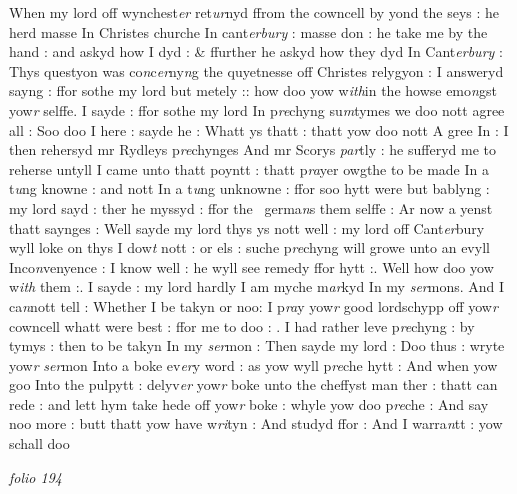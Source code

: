 \documentclass[12pt, a4paper]{book}
\begin{document}
		\ifthenelse{\isodd{\thepage}}
		{\reversemarginpar}
		{\normalmarginpar}
		When my lord off wynchest\textit{er} ret\textit{ur}nyd ffrom the cowncell by yond the seys : he herd masse In Christes churche In cant\textit{erbury} : masse don : he take me by the hand : and askyd how I dyd : \& ffurther he askyd how they dyd In Cant\textit{erbury} : Thys questyon was co\textit{n}c\textit{er}ny\textit{n}g the quyetnesse off Christes relygyon : I answeryd sayng : ffor sothe my lord but metely :: how doo yow w\textit{ith}in the howse emo\textit{n}gst yow\textit{r} selffe. I sayde : ffor sothe my lord In p\textit{re}chyng su\textit{m}tymes we doo nott agree all : Soo doo I here : sayde he : Whatt ys thatt : thatt yow doo nott A gree In : I then rehersyd mr Rydleys p\textit{re}chynges And mr Scorys \textit{par}tly : he sufferyd me to reherse untyll I came unto thatt poyntt : thatt p\textit{ra}yer owgthe to be made In a t\textit{u}ng knowne : and nott In a t\textit{u}ng unknowne : ffor soo hytt were but bablyng : my lord sayd : ther he myssyd : ffor the  germa\textit{n}s them selffe : Ar now a yenst thatt saynges : Well sayde my lord thys ys nott well : my lord off Cant\textit{er}bury wyll loke on thys I dow\textit{t} nott : or els : suche p\textit{re}chyng will growe unto  an evyll Inco\textit{n}venyence : I know well : he wyll see remedy  ffor hytt :. Well how doo yow w\textit{ith} them :. I sayde : my lord hardly I am myche m\textit{ar}kyd In my \textit{ser}mons. And I ca\textit{n}nott tell : Whether I be takyn or noo: I p\textit{ra}y yow\textit{r} good lordschypp off yow\textit{r} cowncell whatt were best : ffor me to doo : . I had rather leve p\textit{re}chyng : by tymys : then to be takyn In my \textit{ser}mon : Then sayde my lord : Doo  thus : wryte yow\textit{r}
      				\textit{ser}mon Into a boke ev\textit{er}y word : as yow wyll p\textit{re}che hytt : And when yow goo Into the pulpytt : delyv\textit{er} yow\textit{r} boke unto  the cheffyst man ther : thatt can rede : and lett hym take hede off yow\textit{r} boke : whyle yow doo p\textit{re}che : And say noo more : butt thatt yow have w\textit{ri}tyn : And studyd ffor : And I warra\textit{n}tt : yow schall doo
      				
\dotfill
						\newpage
{}

\textit{folio 194}
      				
      				
      				
\end{document}
